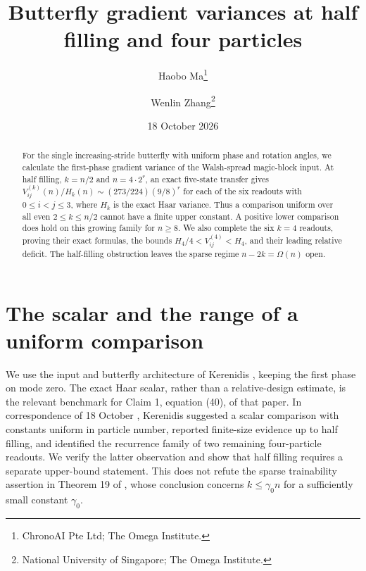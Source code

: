 \documentclass[11pt]{article}
\title{Butterfly gradient variances at half filling and four particles}
\author{Haobo Ma\thanks{ChronoAI Pte Ltd; The Omega Institute.}\and
Wenlin Zhang\thanks{National University of Singapore; The Omega Institute.}}
\date{18 October 2026}
\begin{document}
\maketitle
\begin{abstract}
For the single increasing-stride butterfly with uniform phase and rotation angles,
we calculate the first-phase gradient variance of the Walsh-spread magic-block input.
At half filling, $k=n/2$ and $n=4\cdot2^r$, an exact five-state transfer gives
$V^{(k)}_{ij}(n)/H_k(n)\sim(273/224)(9/8)^r$ for each of the six readouts
with $0\leq i<j\leq3$, where $H_k$ is the exact Haar variance.
Thus a comparison uniform over all even $2\leq k\leq n/2$ cannot have a finite
upper constant. A positive lower comparison does hold on this growing family
for $n\geq8$. We also complete the six $k=4$ readouts, proving their exact formulas,
the bounds $H_4/4<V^{(4)}_{ij}<H_4$, and their leading relative deficit.
The half-filling obstruction leaves the sparse regime $n-2k=\Omega(n)$ open.
\end{abstract}

\section{The scalar and the range of a uniform comparison}
We use the input and butterfly architecture of Kerenidis \cite{K}, keeping the
first phase on mode zero. The exact Haar scalar, rather than a relative-design
estimate, is the relevant benchmark for Claim 1, equation (40), of that paper.
In correspondence of 18 October \cite{communication}, Kerenidis suggested a
scalar comparison with constants uniform in particle number, reported finite-size
evidence up to half filling, and identified the recurrence family of two remaining
four-particle readouts. We verify the latter observation and show that half filling
requires a separate upper-bound statement. This does not refute the sparse
trainability assertion in Theorem 19 of \cite{K}, whose conclusion concerns
$k\leq\gamma_0 n$ for a sufficiently small constant $\gamma_0$.
\end{document}
